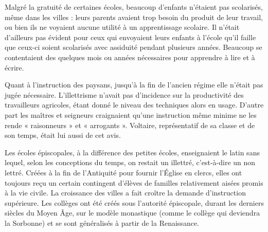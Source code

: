  Malgré la gratuité de certaines écoles, beaucoup d'enfants n'étaient pas scolarisés, même dans les villes : leurs parents avaient trop besoin du produit de leur travail, ou bien ils ne voyaient aucune utilité à un apprentissage scolaire. Il n'était d'ailleurs pas évident pour ceux qui envoyaient leurs enfants à l'école qu'il faille que ceux-ci soient scolarisés avec assiduité pendant plusieurs années. Beaucoup se contentaient des quelques mois ou années nécessaires pour apprendre à lire et à écrire.

 Quant à l'instruction des paysans, jusqu'à la fin de l'ancien régime elle n'était pas jugée nécessaire. L'illettrisme n'avait pas d'incidence sur la productivité des travailleurs agricoles, étant donné le niveau des techniques alors en usage. D'autre part les maîtres et seigneurs craignaient qu'une instruction même minime ne les rende « raisonneurs » et « arrogants ». Voltaire, représentatif de sa classe et de son temps, était lui aussi de cet avis.

 Les écoles épiscopales, à la différence des petites écoles, enseignaient le latin sans lequel, selon les conceptions du temps, on restait un illettré, c'est-à-dire un non lettré. Créées à la fin de l'Antiquité pour fournir l'Église en clercs, elles ont toujours reçu un certain contingent d'élèves de familles relativement aisées promis à la vie civile. La croissance des villes a fait croître la demande d'instruction supérieure. Les collèges ont été créés sous l'autorité épiscopale, durant les derniers siècles du Moyen Âge, sur le modèle monastique (comme le collège qui deviendra la Sorbonne) et se sont généralisés à partir de la Renaissance.

